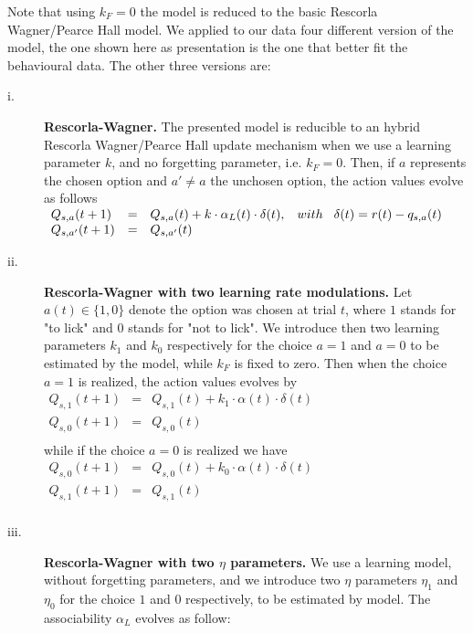 Note that using $k_F = 0$ the model is reduced to the basic Rescorla Wagner/Pearce Hall model. We applied to our data four different version of the model, the one shown here as presentation is the one that better fit the behavioural data. The other three versions are:
\begin{description}
    \item[i.] \textbf{Rescorla-Wagner.} The presented model is reducible to an hybrid Rescorla Wagner/Pearce Hall update mechanism when we use a learning parameter $k$, and no forgetting parameter, i.e. $k_F = 0$.
    Then, if $a$ represents the chosen option and $a'\neq a$ the unchosen option, the action values evolve as follows\\
    $\begin{array}{lcl}
    Q_{s,a}(t+1)&=& Q_{s,a}(t)+k\cdot\alpha_L(t)\cdot\delta(t), \hspace{0.3cm} with \hspace{0.3cm}\delta(t)=r(t)-q_{s,a}(t)\\
    Q_{s,a'}(t+1)&=&Q_{s,a'}(t)\\
    \end{array}$
    \item[ii.] \textbf{Rescorla-Wagner with two learning rate modulations.} Let $a(t) \in \{1,0\}$ denote the option was chosen at trial $t$, where $1$ stands for "to lick" and $0$ stands for "not to lick". We introduce then two learning parameters $k_{1}$ and $k_{0}$ respectively for the choice $a=1$ and $a=0$ to be estimated by the model, while $k_F$ is fixed to zero.
    Then when the choice $a=1$ is realized, the action values evolves by\\
   $\begin{array}{lcl}
       Q_{s,1}(t+1)&=&Q_{s,1}(t)+k_1\cdot\alpha(t)\cdot\delta(t)\\
         Q_{s,0}(t+1)&=&Q_{s,0}(t)\\ 
    \end{array}$\\
    while if the choice $a=0$ is realized we have\\
    $\begin{array}{lcl}
       Q_{s,0}(t+1)&=&Q_{s,0}(t)+k_0\cdot\alpha(t)\cdot\delta(t)\\
         Q_{s,1}(t+1)&=&Q_{s,1}(t)\\ 
    \end{array}$
    \item[iii.] \textbf{Rescorla-Wagner with two $\eta$ parameters.} We use a learning model, without forgetting parameters, and we introduce two $\eta$ parameters $\eta_1$ and $\eta_0$ for the choice $1$ and $0$ respectively, to be estimated by model. The associability $\alpha_L$ evolves as follow:\\

\end{description}
